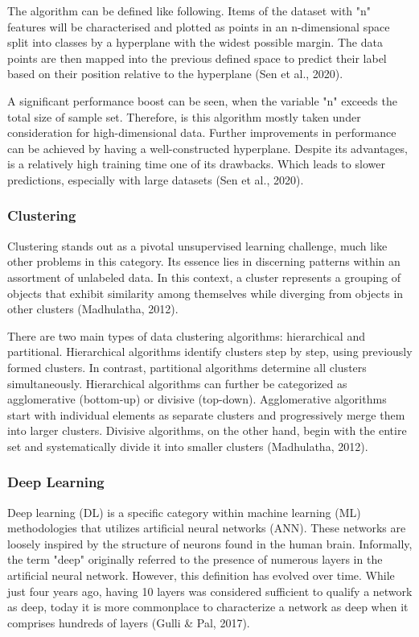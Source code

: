 \documentclass{article}
\begin{document}
\begin{multicols}{2}
The algorithm can be defined like following. Items of the dataset with "n" features will be characterised and plotted as points in an n-dimensional space split into classes by a hyperplane with the widest possible margin. The data points are then mapped into the previous defined space to predict their label based on their position relative to the hyperplane (Sen et al., 2020).

A significant performance boost can be seen, when the variable "n" exceeds the total size of sample set. Therefore, is this algorithm mostly taken under consideration for high-dimensional data. Further improvements in performance can be achieved by having a well-constructed hyperplane. Despite its advantages, is a relatively high training time one of its drawbacks. Which leads to slower predictions, especially with large datasets (Sen et al., 2020).


\subsubsection{Clustering}

Clustering stands out as a pivotal unsupervised learning challenge, much like other problems in this category. Its essence lies in discerning patterns within an assortment of unlabeled data. In this context, a cluster represents a grouping of objects that exhibit similarity among themselves while diverging from objects in other clusters (Madhulatha, 2012).

There are two main types of data clustering algorithms: hierarchical and partitional. Hierarchical algorithms identify clusters step by step, using previously formed clusters. In contrast, partitional algorithms determine all clusters simultaneously. Hierarchical algorithms can further be categorized as agglomerative (bottom-up) or divisive (top-down). Agglomerative algorithms start with individual elements as separate clusters and progressively merge them into larger clusters. Divisive algorithms, on the other hand, begin with the entire set and systematically divide it into smaller clusters (Madhulatha, 2012).


\subsubsection{Deep Learning}

Deep learning (DL) is a specific category within machine learning (ML) methodologies that utilizes artificial neural networks (ANN). These networks are loosely inspired by the structure of neurons found in the human brain. Informally, the term "deep" originally referred to the presence of numerous layers in the artificial neural network. However, this definition has evolved over time. While just four years ago, having 10 layers was considered sufficient to qualify a network as deep, today it is more commonplace to characterize a network as deep when it comprises hundreds of layers (Gulli \& Pal, 2017). 


\end{multicols}
\end{document}

